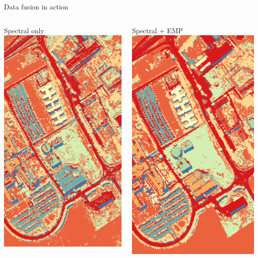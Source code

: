 \documentclass[10pt,aspectratio=1610]{beamer}
\begin{document}
\begin{frame}[fragile,label={sec:org11b2e48}]{Data fusion in action}
\begin{columns}
\begin{column}{0.3\columnwidth}
\begin{block}{Spectral only}
\includegraphics[trim=2.cm 1cm 2cm 14.304cm, clip=true,width=\textwidth,height=0.8\textwidth]{./figures/university_tm_svm.png}
\end{block}
\end{column}
\begin{column}{0.3\columnwidth}
\begin{block}{Spectral + EMP}
\includegraphics[trim=2.cm 1cm 2cm 14.304cm, clip=true,width=\textwidth,height=0.8\textwidth]{./figures/university_tm_fusion.png}
\end{block}
\end{column}
\end{columns}
\end{frame}
\end{document}
